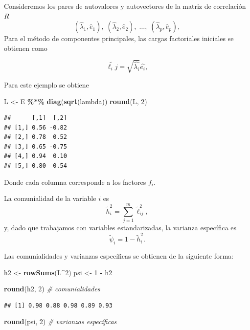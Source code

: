 \documentclass[
]{book}
\newenvironment{Shaded}{\begin{snugshade}}{\end{snugshade}}
\newcommand{\CommentTok}[1]{\textcolor[rgb]{0.56,0.35,0.01}{\textit{#1}}}
\newcommand{\DecValTok}[1]{\textcolor[rgb]{0.00,0.00,0.81}{#1}}
\newcommand{\FunctionTok}[1]{\textcolor[rgb]{0.13,0.29,0.53}{\textbf{#1}}}
\newcommand{\NormalTok}[1]{#1}
\newcommand{\OtherTok}[1]{\textcolor[rgb]{0.56,0.35,0.01}{#1}}
\newcommand{\SpecialCharTok}[1]{\textcolor[rgb]{0.81,0.36,0.00}{\textbf{#1}}}
\begin{document}
Consideremos los pares de autovalores y autovectores de la matriz de correlación \(R\)
\[
(\hat{\lambda}_1, \hat{e}_1),\; (\hat{\lambda}_2, \hat{e}_2),\; \dots,\; (\hat{\lambda}_p, \hat{e}_p),
\]
Para el método de componentes principales, las cargas factoriales iniciales se obtienen como

\[
\tilde{\ell_ij} = \sqrt{\hat{\lambda_i}}\hat{e_i} ,
 \]

Para este ejemplo se obtiene

\begin{Shaded}
\begin{Highlighting}[]
\NormalTok{L }\OtherTok{\textless{}{-}}\NormalTok{ E }\SpecialCharTok{\%*\%} \FunctionTok{diag}\NormalTok{(}\FunctionTok{sqrt}\NormalTok{(lambda))}
\FunctionTok{round}\NormalTok{(L, }\DecValTok{2}\NormalTok{)}
\end{Highlighting}
\end{Shaded}

\begin{verbatim}
##      [,1]  [,2]
## [1,] 0.56 -0.82
## [2,] 0.78  0.52
## [3,] 0.65 -0.75
## [4,] 0.94  0.10
## [5,] 0.80  0.54
\end{verbatim}

Donde cada columna corresponde a los factores \(f_i\).

La comunialidad de la variable \(i\) es
\[
\tilde{h}_i^2 = \sum_{j=1}^m \tilde{\ell}_{ij}^2,
\]
y, dado que trabajamos con variables estandarizadas, la varianza
específica es
\[
\tilde{\psi}_i = 1 - \tilde{h}_i^2.
\]

Las comunialidades y varianzas específicas se obtienen de la siguiente forma:

\begin{Shaded}
\begin{Highlighting}[]
\NormalTok{h2  }\OtherTok{\textless{}{-}} \FunctionTok{rowSums}\NormalTok{(L}\SpecialCharTok{\^{}}\DecValTok{2}\NormalTok{)}
\NormalTok{psi }\OtherTok{\textless{}{-}} \DecValTok{1} \SpecialCharTok{{-}}\NormalTok{ h2}

\FunctionTok{round}\NormalTok{(h2, }\DecValTok{2}\NormalTok{)        }\CommentTok{\# comunialidades}
\end{Highlighting}
\end{Shaded}

\begin{verbatim}
## [1] 0.98 0.88 0.98 0.89 0.93
\end{verbatim}

\begin{Shaded}
\begin{Highlighting}[]
\FunctionTok{round}\NormalTok{(psi, }\DecValTok{2}\NormalTok{)       }\CommentTok{\# varianzas específicas}
\end{Highlighting}
\end{Shaded}
\end{document}
